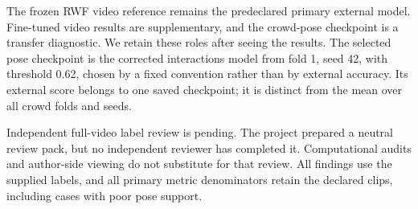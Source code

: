 The frozen RWF video reference remains the predeclared primary external model. Fine-tuned video results are supplementary, and the crowd-pose checkpoint is a transfer diagnostic. We retain these roles after seeing the results. The selected pose checkpoint is the corrected interactions model from fold 1, seed 42, with threshold 0.62, chosen by a fixed convention rather than by external accuracy. Its external score belongs to one saved checkpoint; it is distinct from the mean over all crowd folds and seeds.

Independent full-video label review is pending. The project prepared a neutral review pack, but no independent reviewer has completed it. Computational audits and author-side viewing do not substitute for that review. All findings use the supplied labels, and all primary metric denominators retain the declared clips, including cases with poor pose support.
